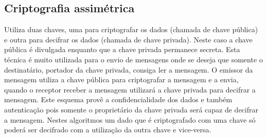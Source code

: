 \subsection{Criptografia assimétrica}
Utiliza duas chaves, uma para criptografar os dados (chamada de chave pública) e outra para decifrar os dados (chamada de chave privada). Neste caso a chave pública é divulgada enquanto que a chave privada permanece secreta. Esta técnica é muito utilizada para o envio de mensagens onde se deseja que somente o destinatário, portador da chave privada, consiga ler a mensagem. O emissor da mensagem utiliza a chave pública para criptografar a mensagem e a envia, quando o receptor receber a mensagem utilizará a chave privada para decifrar a mensagem. Este esquema provê a confidencialidade dos dados e também autenticação pois somente o proprietário da chave privada será capaz de decifrar a mensagem. Nestes algoritmos um dado que é criptografado com uma chave só poderá ser decifrado com a utilização da outra chave e vice-versa.


